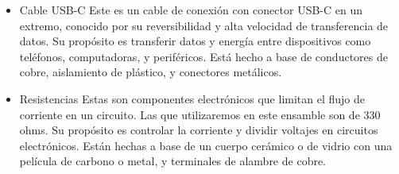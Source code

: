 \begin{itemize}
\begin{itemize}
    \item Cable USB-C
    Este es un cable de conexión con conector USB-C en un extremo, conocido por su reversibilidad y alta velocidad de transferencia de datos. Su propósito es transferir datos y energía entre dispositivos como teléfonos, computadoras, y periféricos. Está hecho a base de conductores de cobre, aislamiento de plástico, y conectores metálicos.
    
    \item Resistencias
    Estas son componentes electrónicos que limitan el flujo de corriente en un circuito. Las que utilizaremos en este ensamble son de 330 ohms. Su propósito es controlar la corriente y dividir voltajes en circuitos electrónicos. Están hechas a base de un cuerpo cerámico o de vidrio con una película de carbono o metal, y terminales de alambre de cobre.


\end{itemize}
\end{itemize}
